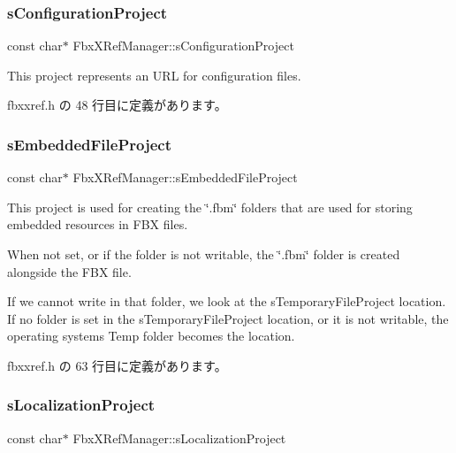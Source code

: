 \subsubsection{\texorpdfstring{s\+Configuration\+Project}{sConfigurationProject}}
{\footnotesize\ttfamily const char$\ast$ Fbx\+X\+Ref\+Manager\+::s\+Configuration\+Project\hspace{0.3cm}{\ttfamily [static]}}



This project represents an U\+RL for configuration files. 



 fbxxref.\+h の 48 行目に定義があります。

\mbox{\label{class_fbx_x_ref_manager_a9d815646f6d592942ce288a4de5eb39d}} 
\subsubsection{\texorpdfstring{s\+Embedded\+File\+Project}{sEmbeddedFileProject}}
{\footnotesize\ttfamily const char$\ast$ Fbx\+X\+Ref\+Manager\+::s\+Embedded\+File\+Project\hspace{0.3cm}{\ttfamily [static]}}

This project is used for creating the \char`\"{}.\+fbm\char`\"{} folders that are used for storing embedded resources in F\+BX files.

When not set, or if the folder is not writable, the \char`\"{}.\+fbm\char`\"{} folder is created alongside the F\+BX file.

If we cannot write in that folder, we look at the s\+Temporary\+File\+Project location. If no folder is set in the s\+Temporary\+File\+Project location, or it is not writable, the operating system\textquotesingle{}s Temp folder becomes the location. 

 fbxxref.\+h の 63 行目に定義があります。

\mbox{\label{class_fbx_x_ref_manager_ac37aa54c7d0914ed376e7f4dd6f51229}} 
\subsubsection{\texorpdfstring{s\+Localization\+Project}{sLocalizationProject}}
{\footnotesize\ttfamily const char$\ast$ Fbx\+X\+Ref\+Manager\+::s\+Localization\+Project\hspace{0.3cm}{\ttfamily [static]}}




